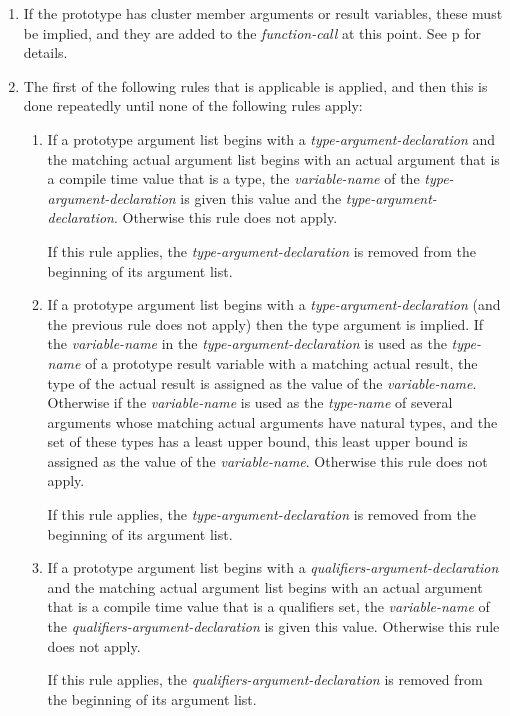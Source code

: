 \documentclass[12pt]{article}
\newcommand{\pagref}[1]{p\pageref{#1}}
\begin{document}
\begin{enumerate}
\item
If the prototype has cluster member arguments or result variables,
these must be implied, and they are added to the {\em function-call}
at this point.  See \pagref{CLUSTER-ARGUMENTS} for details.

\item
The first of the following rules that is applicable is applied,
and then this is done repeatedly until none of the following
rules apply:

\begin{enumerate}

\item
If a prototype argument list begins with a {\em type-argument-declaration}
and the matching actual argument list begins with an
actual argument that is a compile time value that is a type,
the {\em variable-name} of the {\em type-argument-declaration}
is given this value and the {\em type-argument-declaration}.
Otherwise this rule does not apply.

If this rule applies, the {\em type-argument-declaration}
is removed from the beginning of its argument list.

\item
If a prototype argument list begins with a {\em type-argument-declaration}
(and the previous rule does not apply)
then the type argument is implied.  If the {\em variable-name}
in the {\em type-argument-declaration} is used as the {\em type-name}
of a prototype result variable with a matching actual result,
the type of the actual result is assigned as the value of the
{\em variable-name}.  Otherwise if the {\em variable-name}
is used as the {\em type-name} of several arguments whose matching
actual arguments have natural types, and the set of these types
has a least upper bound, this least upper bound is assigned as the
value of the {\em variable-name}.
Otherwise this rule does not apply.

If this rule applies, the {\em type-argument-declaration}
is removed from the beginning of its argument list.

\item
If a prototype argument list begins with a {\em qualifiers-argument-declaration}
and the matching actual argument list begins with an
actual argument that is a compile time value that is a qualifiers set,
the {\em variable-name} of the {\em qualifiers-argument-declaration}
is given this value.
Otherwise this rule does not apply.

If this rule applies, the {\em qualifiers-argument-declaration}
is removed from the beginning of its argument list.



\end{enumerate}
\end{enumerate}
\end{document}
